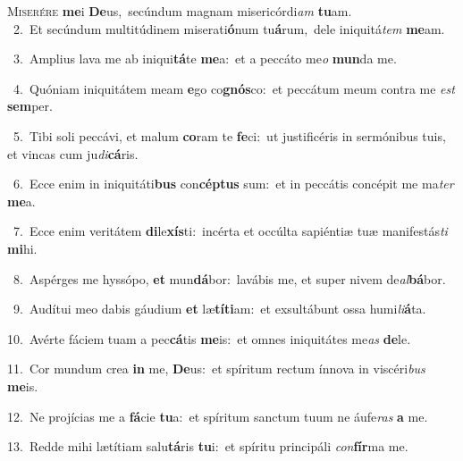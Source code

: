 \lettrine{\initial\textcolor{\initialcolor}{M}}{iserére} \textbf{me}\-i \textbf{De}\-us,~\star secúndum magnam misericórdi\textit{am} \textbf{tu}\-am.\\
{\numbfont\textcolor{\numbcolor}{~2.}}~Et secúndum multitúdinem miserati\-\textbf{ó}\-num tu\-\textbf{á}\-rum,~\star dele iniquitá\textit{tem} \textbf{me}\-am.\par
{\numbfont\textcolor{\numbcolor}{~3.}}~Amplius lava me ab iniqui\-\textbf{tá}\-te \textbf{me}\-a:~\star et a peccáto me\textit{o} \textbf{mun}\-da me.\par
{\numbfont\textcolor{\numbcolor}{~4.}}~Quóniam iniquitátem meam \textbf{e}\-go co\-\textbf{gnós}\-co:~\star et peccátum meum contra me \textit{est} \textbf{sem}\-per.\par
{\numbfont\textcolor{\numbcolor}{~5.}}~Tibi soli peccávi, et malum \textbf{co}\-ram te \textbf{fe}\-ci:~\star ut justificéris in sermónibus tuis, et vincas cum ju\-\textit{di}\-\textbf{cá}ris.\par
{\numbfont\textcolor{\numbcolor}{~6.}}~Ecce enim in iniquitáti\textbf{bus} con\-\textbf{cép}\-\textbf{tus} sum:~\star et in peccátis concépit me ma\textit{ter} \textbf{me}\-a.\par
{\numbfont\textcolor{\numbcolor}{~7.}}~Ecce enim veritátem \textbf{di}\-le\-\textbf{xís}\-ti:~\star incérta et occúlta sapiéntiæ tuæ manifestás\textit{ti} \textbf{mi}\-hi.\par
{\numbfont\textcolor{\numbcolor}{~8.}}~Aspérges me hyssópo, \textbf{et} mun\-\textbf{dá}\-bor:~\star lavábis me, et super nivem de\-\textit{al}\-\textbf{bá}bor.\par
{\numbfont\textcolor{\numbcolor}{~9.}}~Audítui meo dabis gáudium \textbf{et} læ\-\textbf{tí}\-\textbf{ti}am:~\star et exsultábunt ossa humi\-\textit{li}\-\textbf{á}ta.\par
{\numbfont\textcolor{\numbcolor}{10.}}~Avérte fáciem tuam a pec\-\textbf{cá}\-tis \textbf{me}\-is:~\star et omnes iniquitátes me\textit{as} \textbf{de}\-le.\par
{\numbfont\textcolor{\numbcolor}{11.}}~Cor mundum crea \textbf{in} me, \textbf{De}\-us:~\star et spíritum rectum ínnova in viscéri\textit{bus} \textbf{me}\-is.\par
{\numbfont\textcolor{\numbcolor}{12.}}~Ne projícias me a \textbf{fá}\-cie \textbf{tu}\-a:~\star et spíritum sanctum tuum ne áufe\textit{ras} \textbf{a} me.\par
{\numbfont\textcolor{\numbcolor}{13.}}~Redde mihi lætítiam salu\-\textbf{tá}\-ris \textbf{tu}\-i:~\star et spíritu principáli \textit{con}\-\textbf{fír}ma me.\par
